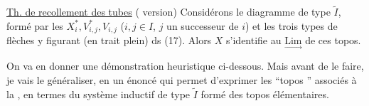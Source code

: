 \uline{Th. de recollement des tubes} ( version) Considérons le diagramme de type $\widetilde I$, formé par les $X_i^*,V_{i,j}^*,V_{i,j}$ ($i,j\in I$, $j$ un successeur de $i$) et les trois types de flèches y figurant (en trait plein) ds (17). Alors $X$ s'identifie au   $\underset{\longrightarrow}{\mathrm{Lim}}$ de ces topos.



On va en donner une démonstration heuristique ci-dessous. Mais avant de le faire, je vais le généraliser, en un énoncé qui permet d'exprimer  les ``topos '' associés à la , en termes du système inductif de type $\widetilde I$ formé des topos élémentaires.

